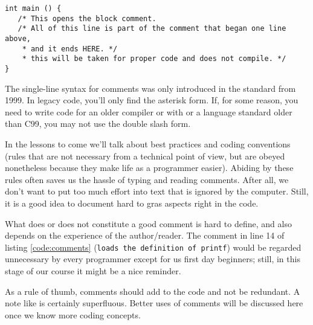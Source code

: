 \begin{warnbox}[nested block comments, leftupper=7mm]
\begin{verbatim}
int main () {
   /* This opens the block comment.
   /* All of this line is part of the comment that began one line above,
    * and it ends HERE. */
    * this will be taken for proper code and does not compile. */
}
\end{verbatim}
\end{warnbox}

\begin{plusbox}
The single-line syntax for comments was only introduced in the standard from 1999. In legacy code, you'll only find the asterisk form. If, for some reason, you need to write code for an older compiler or with or a language standard older than C99, you may not use the double slash form.
\end{plusbox}

In the lessons to come we'll talk about best practices and coding conventions (rules that are not necessary from a technical point of view, but are obeyed nonetheless because they make life as a programmer easier). Abiding by these rules often saves us the hassle of typing and reading comments. After all, we don't want to put too much effort into text that is ignored by the computer. Still, it is a good idea to document hard to gras aspects right in the code.

What does or does not constitute a good comment is hard to define, and also depends on the experience of the author/reader. The comment in line 14 of listing \ref{code:comments} (\texttt{loads the definition of printf}) would be regarded unnecessary by every programmer except for us first day beginners; still, in this stage of our course it might be a nice reminder.

As a rule of thumb, comments should add to the code and not be redundant. A note like 
\vspace{-9pt}
\vspace{-9pt}
is certainly superfluous. Better uses of comments will be discussed here once we know more coding concepts.

